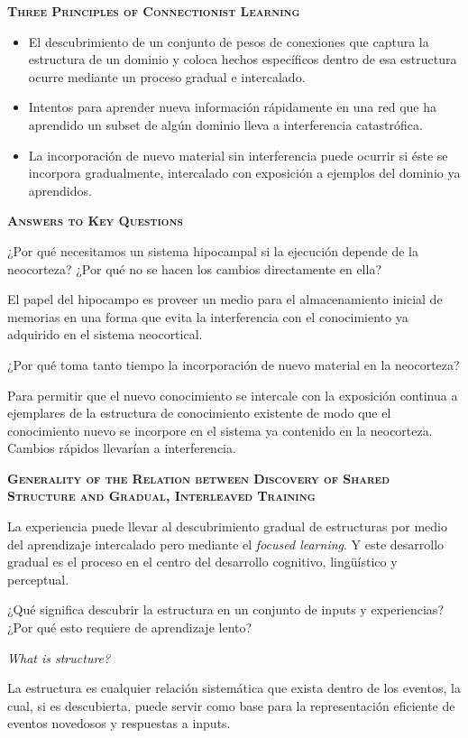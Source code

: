 \documentclass[a4paper,12pt]{article}
\begin{document}
{\scshape\bfseries Three Principles of Connectionist Learning}

\begin{itemize}
	\item El descubrimiento de un conjunto de pesos de conexiones que captura la estructura de un dominio y coloca hechos específicos dentro de esa estructura ocurre mediante un proceso gradual e intercalado.
	\item Intentos para aprender nueva información rápidamente en una red que ha aprendido un subset de algún dominio lleva a interferencia catastrófica.
	\item La incorporación de nuevo material sin interferencia puede ocurrir si éste se incorpora gradualmente, intercalado con exposición a ejemplos del dominio ya aprendidos.
\end{itemize}

{\scshape\bfseries Answers to Key Questions}

¿Por qué necesitamos un sistema hipocampal si la ejecución depende de la neocorteza? ¿Por qué no se hacen los cambios directamente en ella?

El papel del hipocampo es proveer un medio para el almacenamiento inicial de memorias en una forma que evita la interferencia con el conocimiento ya adquirido en el sistema neocortical.

¿Por qué toma tanto tiempo la incorporación de nuevo material en la neocorteza?

Para permitir que el nuevo conocimiento se intercale con la exposición continua a ejemplares de la estructura de conocimiento existente de modo que el conocimiento nuevo se incorpore en el sistema ya contenido en la neocorteza. Cambios rápidos llevarían a interferencia.

{\scshape\bfseries Generality of the Relation between Discovery of Shared Structure and Gradual, Interleaved Training}

La experiencia puede llevar al descubrimiento gradual de estructuras por medio del aprendizaje intercalado pero mediante el {\itshape focused learning}. Y este desarrollo gradual es el proceso en el centro del desarrollo cognitivo, lingüístico y perceptual. 

¿Qué significa descubrir la estructura en un conjunto de inputs y experiencias? ¿Por qué esto requiere de aprendizaje lento?

{\itshape What is structure?}

La estructura es cualquier relación sistemática que exista dentro de los eventos, la cual, si es descubierta, puede servir como base para la representación eficiente de eventos novedosos y respuestas a inputs.
\end{document}
